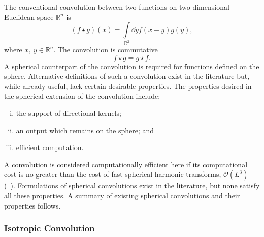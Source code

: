 The conventional convolution between two functions on two-dimensional Euclidean space \(\mathbb{R}^{n}\) is
%
\begin{equation}
	(f \star g)(x)
	= \int\limits_{\mathbb{R}^{2}} \dd{y} f(x-y) g(y),
\end{equation}
%
where \(x,\ y \in \mathbb{R}^{n}\).
The convolution is commutative
%
\begin{equation}
	f \star g
	= g \star f.
\end{equation}
%
A spherical counterpart of the convolution is required for functions defined on the sphere.
Alternative definitions of such a convolution exist in the literature but, while already useful, lack certain desirable properties.
The properties desired in the spherical extension of the convolution include:
%
\begin{enumerate}[(i),nosep,left=\parindent]
	\item the support of directional kernels;
	\item an output which remains on the sphere; and
	\item efficient computation.
\end{enumerate}
%
A convolution is considered computationally efficient here if its computational cost is no greater than the cost of fast spherical harmonic transforms, \ie{} \(\mathcal{O}(L^{3})\) (\eg{}~\cite{Driscoll1994,McEwen2011}).
Formulations of spherical convolutions exist in the literature, but none satisfy all these properties.
A summary of existing spherical convolutions and their properties follows.

\subsubsection{Isotropic Convolution}

